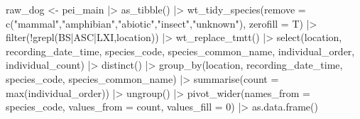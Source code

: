 \documentclass[
  letterpaper,
  DIV=11,
  numbers=noendperiod,
  oneside]{scrartcl}
\newenvironment{Shaded}{\begin{snugshade}}{\end{snugshade}}
\newcommand{\AttributeTok}[1]{\textcolor[rgb]{0.40,0.45,0.13}{#1}}
\newcommand{\DecValTok}[1]{\textcolor[rgb]{0.68,0.00,0.00}{#1}}
\newcommand{\FunctionTok}[1]{\textcolor[rgb]{0.28,0.35,0.67}{#1}}
\newcommand{\NormalTok}[1]{\textcolor[rgb]{0.00,0.23,0.31}{#1}}
\newcommand{\OtherTok}[1]{\textcolor[rgb]{0.00,0.23,0.31}{#1}}
\newcommand{\SpecialCharTok}[1]{\textcolor[rgb]{0.37,0.37,0.37}{#1}}
\newcommand{\StringTok}[1]{\textcolor[rgb]{0.13,0.47,0.30}{#1}}
\begin{document}
\begin{Shaded}
\begin{Highlighting}[]
\NormalTok{raw\_dog }\OtherTok{\textless{}{-}}\NormalTok{ pei\_main }\SpecialCharTok{|\textgreater{}} 
  \FunctionTok{as\_tibble}\NormalTok{() }\SpecialCharTok{|\textgreater{}}
  \FunctionTok{wt\_tidy\_species}\NormalTok{(}\AttributeTok{remove =} \FunctionTok{c}\NormalTok{(}\StringTok{"mammal"}\NormalTok{,}\StringTok{"amphibian"}\NormalTok{,}\StringTok{"abiotic"}\NormalTok{,}\StringTok{"insect"}\NormalTok{,}\StringTok{"unknown"}\NormalTok{), }\AttributeTok{zerofill =}\NormalTok{ T) }\SpecialCharTok{|\textgreater{}}
  \FunctionTok{filter}\NormalTok{(}\SpecialCharTok{!}\FunctionTok{grepl}\NormalTok{(}\StringTok{\textquotesingle{}BS|ASC|LXI\textquotesingle{}}\NormalTok{,location)) }\SpecialCharTok{|\textgreater{}}
  \FunctionTok{wt\_replace\_tmtt}\NormalTok{() }\SpecialCharTok{|\textgreater{}}
  \FunctionTok{select}\NormalTok{(location, recording\_date\_time, species\_code, species\_common\_name, individual\_order, individual\_count) }\SpecialCharTok{|\textgreater{}}
  \FunctionTok{distinct}\NormalTok{() }\SpecialCharTok{|\textgreater{}}
  \FunctionTok{group\_by}\NormalTok{(location, recording\_date\_time, species\_code, species\_common\_name) }\SpecialCharTok{|\textgreater{}}
  \FunctionTok{summarise}\NormalTok{(}\AttributeTok{count =} \FunctionTok{max}\NormalTok{(individual\_order)) }\SpecialCharTok{|\textgreater{}}
  \FunctionTok{ungroup}\NormalTok{() }\SpecialCharTok{|\textgreater{}}
  \FunctionTok{pivot\_wider}\NormalTok{(}\AttributeTok{names\_from =}\NormalTok{ species\_code, }\AttributeTok{values\_from =}\NormalTok{ count, }\AttributeTok{values\_fill =} \DecValTok{0}\NormalTok{) }\SpecialCharTok{|\textgreater{}}
  \FunctionTok{as.data.frame}\NormalTok{()}
\end{Highlighting}
\end{Shaded}
\end{document}
